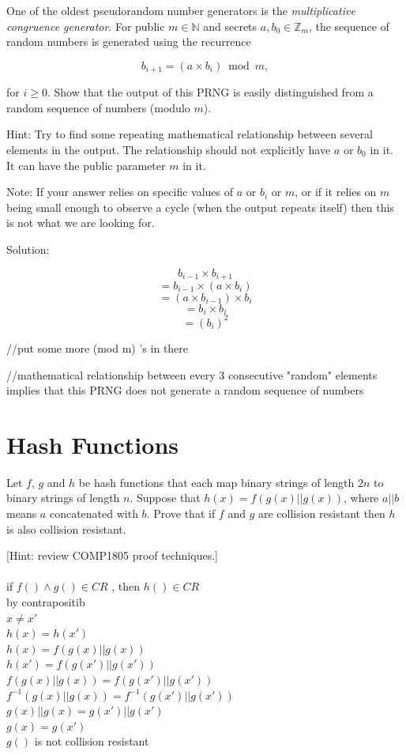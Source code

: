 \documentclass[12pt, letterpaper]{article}
\begin{document}
One of the oldest pseudorandom number generators is the \emph{multiplicative congruence generator}.  For public $m \in \mathbb{N}$ and secrets $a,b_0 \in \mathbb{Z}_m$, the sequence of random 
numbers is generated using the recurrence  

\[ b_{i+1} = (a \times b_i) \bmod m,\]

for $i \geq 0$.
Show that the output of this PRNG is easily distinguished from a random sequence 
of numbers (modulo $m$).

\bigskip
Hint: Try to find some repeating mathematical relationship between several
elements in the output. The relationship should not explicitly have $a$ or $b_0$ in it. It can have the public parameter $m$ in it.

\bigskip
Note: If your answer relies on specific values of $a$ or $b_i$ or $m$, or if it relies on $m$ being small enough to observe a cycle (when the output repeats itself) then this is not what we are looking for.  

\bigskip
Solution: 

\[ b_{i-1} \times b_{i+1} \]
\[ = b_{i-1} \times (a \times b_{i}) \]
\[ = (a \times b_{i-1}) \times  b_{i} \]
\[ = b_{i} \times  b_{i} \]
\[ = (b_{i})^2 \]

//put some more (mod m) 's in there 

//mathematical relationship between every 3 consecutive "random" elements implies that this PRNG does not generate a random sequence of numbers 


\clearpage
\section{Hash Functions}

Let $f$, $g$ and $h$ be hash functions that each map binary strings of length $2n$ to binary strings of length $n$.  Suppose that  $h(x) = f( g(x) || g(x) )$, where $a||b$ means $a$ concatenated with $b$.  
Prove that if $f$ and $g$ are collision resistant then $h$ is also collision resistant. 

[Hint: review COMP1805 proof techniques.]\\
\\
if $f() \land g() \in CR$ , then $h() \in CR$ \\
by contrapositib
\\
$x \ne x'$ \\ 
$h(x)=h(x')$ \\
$h(x)=f(g(x)||g(x))$ \\
$h(x')=f(g(x')||g(x'))$ \\
$f(g(x)||g(x))=f(g(x')||g(x'))$ \\
$f^{-1}(g(x)||g(x))=f^{-1}(g(x')|| g(x'))$ \\
$g(x)||g(x)=g(x')||g(x')$ \\
$g(x)=g(x')$ \\
$g()$ is not collision resistant
\end{document}
